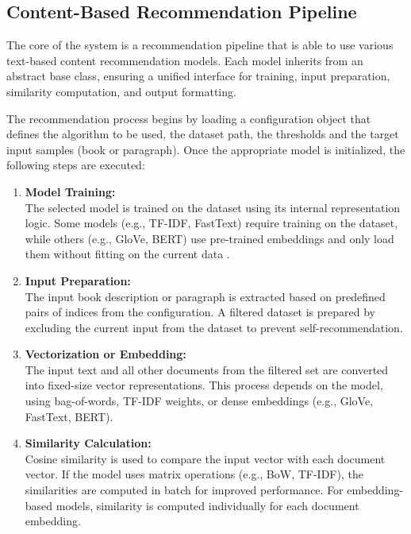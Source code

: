 \documentclass[\myFontSize,a4paper,oneside,hidelinks]{article}
\begin{document}
\subsection{Content-Based Recommendation Pipeline}
The core of the system is a recommendation pipeline that is able to use various text-based content recommendation models. Each model inherits from an abstract base class, ensuring a unified interface for training, input preparation, similarity computation, and output formatting.

The recommendation process begins by loading a configuration object that defines the algorithm to be used, the dataset path, the thresholds and the target input samples (book or paragraph). Once the appropriate model is initialized, the following steps are executed:

\begin{enumerate}
    \item \textbf{Model Training:}\\
The selected model is trained on the dataset using its internal representation logic. Some models (e.g., TF-IDF, FastText) require training on the dataset, while others (e.g., GloVe, BERT) use pre-trained embeddings and only load them without fitting on the current data \cite{pennington2014glove}.

    \item \textbf{Input Preparation:}\\
The input book description or paragraph is extracted based on predefined pairs of indices from the configuration. A filtered dataset is prepared by excluding the current input from the dataset to prevent self-recommendation.

    \item \textbf{Vectorization or Embedding:}\\
The input text and all other documents from the filtered set are converted into fixed-size vector representations. This process depends on the model, using bag-of-words, TF-IDF weights, or dense embeddings (e.g., GloVe, FastText, BERT).

    \item \textbf{Similarity Calculation:}\\
Cosine similarity is used to compare the input vector with each document vector. If the model uses matrix operations (e.g., BoW, TF-IDF), the similarities are computed in batch for improved performance. For embedding-based models, similarity is computed individually for each document embedding.


\end{enumerate}
\end{document}
